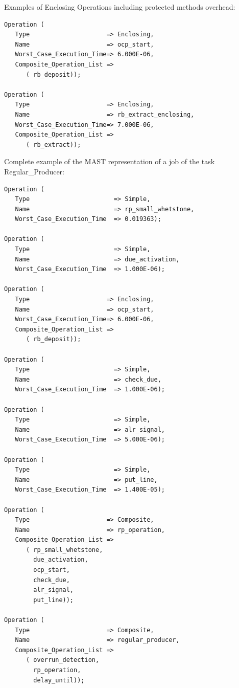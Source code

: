 \documentclass{article}
\begin{document}
Examples of Enclosing Operations including protected methods overhead:

\begin{lstlisting}
Operation (
   Type                     => Enclosing,
   Name                     => ocp_start,
   Worst_Case_Execution_Time=> 6.000E-06,
   Composite_Operation_List =>
      ( rb_deposit));

Operation (
   Type                     => Enclosing,
   Name                     => rb_extract_enclosing,
   Worst_Case_Execution_Time=> 7.000E-06,
   Composite_Operation_List =>
      ( rb_extract));
\end{lstlisting}

Complete example of the MAST representation of a job of the task Regular\_Producer:

\begin{lstlisting}
Operation (
   Type                       => Simple,
   Name                       => rp_small_whetstone,
   Worst_Case_Execution_Time  => 0.019363);

Operation (
   Type                       => Simple,
   Name                       => due_activation,
   Worst_Case_Execution_Time  => 1.000E-06);

Operation (
   Type                     => Enclosing,
   Name                     => ocp_start,
   Worst_Case_Execution_Time=> 6.000E-06,
   Composite_Operation_List =>
      ( rb_deposit));

Operation (
   Type                       => Simple,
   Name                       => check_due,
   Worst_Case_Execution_Time  => 1.000E-06);

Operation (
   Type                       => Simple,
   Name                       => alr_signal,
   Worst_Case_Execution_Time  => 5.000E-06);

Operation (
   Type                       => Simple,
   Name                       => put_line,
   Worst_Case_Execution_Time  => 1.400E-05);

Operation (
   Type                     => Composite,
   Name                     => rp_operation,
   Composite_Operation_List =>
      ( rp_small_whetstone,
        due_activation,
        ocp_start,
        check_due,
        alr_signal,
        put_line));

Operation (
   Type                     => Composite,
   Name                     => regular_producer,
   Composite_Operation_List =>
      ( overrun_detection,
        rp_operation,
        delay_until));
\end{lstlisting}
\end{document}

